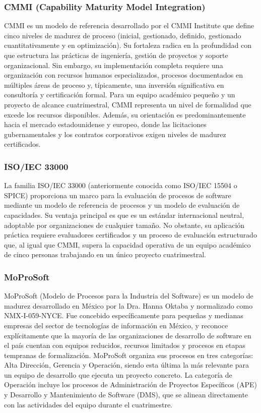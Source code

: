 \documentclass{article}
\begin{document}
\subsubsection{CMMI (Capability Maturity Model Integration)}

CMMI es un modelo de referencia desarrollado por el CMMI Institute que define cinco niveles de madurez de proceso (inicial, gestionado, definido, gestionado cuantitativamente y en optimización). Su fortaleza radica en la profundidad con que estructura las prácticas de ingeniería, gestión de proyectos y soporte organizacional. Sin embargo, su implementación completa requiere una organización con recursos humanos especializados, procesos documentados en múltiples áreas de proceso y, típicamente, una inversión significativa en consultoría y certificación formal. Para un equipo académico pequeño y un proyecto de alcance cuatrimestral, CMMI representa un nivel de formalidad que excede los recursos disponibles. Además, su orientación es predominantemente hacia el mercado estadounidense y europeo, donde las licitaciones gubernamentales y los contratos corporativos exigen niveles de madurez certificados.

\subsubsection{ISO/IEC 33000}

La familia ISO/IEC 33000 (anteriormente conocida como ISO/IEC 15504 o SPICE) proporciona un marco para la evaluación de procesos de software mediante un modelo de referencia de procesos y un modelo de evaluación de capacidades. Su ventaja principal es que es un estándar internacional neutral, adoptable por organizaciones de cualquier tamaño. No obstante, su aplicación práctica requiere evaluadores certificados y un proceso de evaluación estructurado que, al igual que CMMI, supera la capacidad operativa de un equipo académico de cinco personas trabajando en un único proyecto cuatrimestral.

\subsubsection{MoProSoft}

MoProSoft (Modelo de Procesos para la Industria del Software) es un modelo de madurez desarrollado en México por la Dra. Hanna Oktaba y normalizado como NMX-I-059-NYCE. Fue concebido específicamente para pequeñas y medianas empresas del sector de tecnologías de información en México, y reconoce explícitamente que la mayoría de las organizaciones de desarrollo de software en el país cuentan con equipos reducidos, recursos limitados y procesos en etapas tempranas de formalización. MoProSoft organiza sus procesos en tres categorías: Alta Dirección, Gerencia y Operación, siendo esta última la más relevante para un equipo de desarrollo que ejecuta un proyecto concreto. La categoría de Operación incluye los procesos de Administración de Proyectos Específicos (APE) y Desarrollo y Mantenimiento de Software (DMS), que se alinean directamente con las actividades del equipo durante el cuatrimestre.
\end{document}
